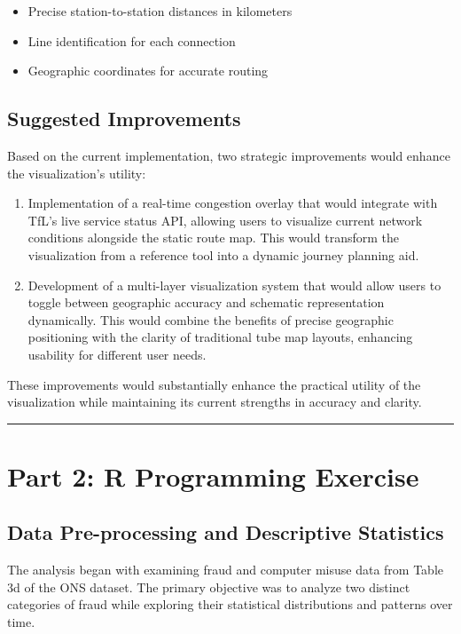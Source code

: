 \documentclass{article}
\begin{document}
\begin{itemize}
    \item Precise station-to-station distances in kilometers
    \item Line identification for each connection
    \item Geographic coordinates for accurate routing
\end{itemize}

\subsection{Suggested Improvements}

Based on the current implementation, two strategic improvements would enhance the visualization's utility:

\begin{enumerate}
    \item Implementation of a real-time congestion overlay that would integrate with TfL's live service status API, allowing users to visualize current network conditions alongside the static route map. This would transform the visualization from a reference tool into a dynamic journey planning aid.
    \item Development of a multi-layer visualization system that would allow users to toggle between geographic accuracy and schematic representation dynamically. This would combine the benefits of precise geographic positioning with the clarity of traditional tube map layouts, enhancing usability for different user needs.
\end{enumerate}

These improvements would substantially enhance the practical utility of the visualization while maintaining its current strengths in accuracy and clarity.

\rule{\linewidth}{0.5pt}
\newpage

\section{Part 2: R Programming Exercise}

\subsection{Data Pre-processing and Descriptive Statistics}

The analysis began with examining fraud and computer misuse data from Table 3d of the ONS dataset. The primary objective was to analyze two distinct categories of fraud while exploring their statistical distributions and patterns over time.
\end{document}
